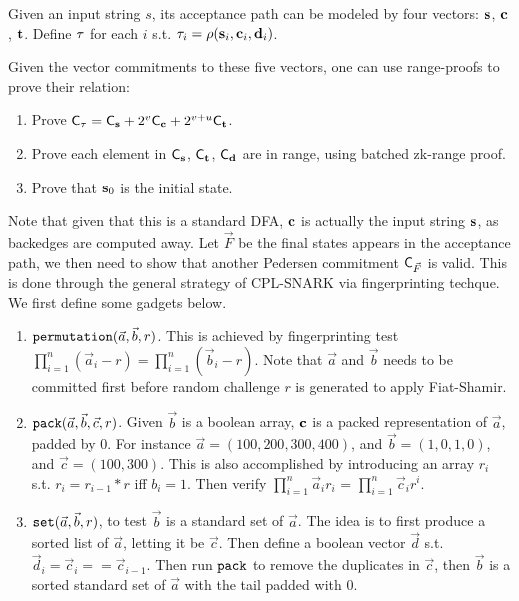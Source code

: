 Given an input string $s$, its
acceptance path can be
modeled by four vectors: ${{\mathbf {s}}}$,
${{\mathbf {c}}}$, ${{\mathbf {t}}}$.
Define ${{\mathbf {\tau}}}$ for each $i$ s.t.
${{\mathbf {\tau}}}_i = \rho({{\mathbf {s}}}_i, {{\mathbf {c}}}_i, {{\mathbf {d}}}_i)$.

Given the vector commitments to these five vectors, one can
use range-proofs to prove their relation:
\begin{enumerate}
  \item Prove ${\mathsf{C}}_{{{\mathbf {\tau}}}} = {\mathsf{C}}_{{{\mathbf {s}}}} + 
  2^v {\mathsf{C}}_{{{\mathbf {c}}}} + 2^{v+u} {\mathsf{C}}_{{{\mathbf {t}}}}$.
  \item Prove each element in ${\mathsf{C}}_{{{\mathbf {s}}}}$,
  ${\mathsf{C}}_{{{\mathbf {t}}}}$, ${\mathsf{C}}_{{{\mathbf {d}}}}$ are in range,
  using batched zk-range proof.
  \item Prove that ${{\mathbf {s}}}_0$ is the initial state.
\end{enumerate}

Note that given that this is a standard DFA,
${{\mathbf {c}}}$ is actually the input string ${{\mathbf {s}}}$, as backedges
are computed away. Let $\vec{F}$ be the final states appears 
in the acceptance path, we then need to show that
another Pedersen commitment ${\mathsf{C}}_{\vec{F}}$ is valid.
This is done through the general strategy of CPL-SNARK
via fingerprinting techque. We first define some gadgets below.

\begin{enumerate}
  \item ${\tt permutation}(\vec{a}, \vec{b}, r)$.  This is achieved
  by fingerprinting test $\prod_{i=1}^n (\vec{a}_i-r) = \prod_{i=1}^n (\vec{b}_i-r)$. Note that $\vec{a}$ and $\vec{b}$ needs to be committed first before
  random challenge $r$ is generated to apply Fiat-Shamir.
  \item ${\tt pack}(\vec{a}, \vec{b}, \vec{c}, r)$. Given $\vec{b}$ is a boolean
  array, ${{\mathbf {c}}}$ is a packed representation of $\vec{a}$, padded by
  $0$. For instance $\vec{a} = (100, 200, 300, 400)$, and
  $\vec{b} = (1, 0, 1, 0)$, and $\vec{c} = (100, 300)$. This is also
  accomplished by introducing an array $r_i$ s.t.
  $r_i = r_{i-1} * r$ iff $b_i= 1$. Then verify
  $\prod_{i=1}^n \vec{a}_i r_i$ = $\prod_{i=1}^n \vec{c}_i r^i$.
  \item ${\tt set}(\vec{a}, \vec{b}, r)$, to test $\vec{b}$ is a 
  standard set of $\vec{a}$. The idea is to first produce
  a sorted list of $\vec{a}$, letting it be $\vec{c}$.
  Then define a boolean vector $\vec{d}$ s.t.
  $\vec{d}_i = \vec{c}_i==\vec{c}_{i-1}$. Then
  run ${\tt pack}$ to remove the duplicates in $\vec{c}$, 
  then $\vec{b}$ is a sorted standard set of $\vec{a}$ with
  the tail padded with $0$.
\end{enumerate}

